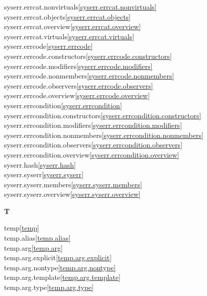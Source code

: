 \begin{multicols}{2}
syserr.errcat.nonvirtuals\quad\ref{syserr.errcat.nonvirtuals}\\
syserr.errcat.objects\quad\ref{syserr.errcat.objects}\\
syserr.errcat.overview\quad\ref{syserr.errcat.overview}\\
syserr.errcat.virtuals\quad\ref{syserr.errcat.virtuals}\\
syserr.errcode\quad\ref{syserr.errcode}\\
syserr.errcode.constructors\quad\ref{syserr.errcode.constructors}\\
syserr.errcode.modifiers\quad\ref{syserr.errcode.modifiers}\\
syserr.errcode.nonmembers\quad\ref{syserr.errcode.nonmembers}\\
syserr.errcode.observers\quad\ref{syserr.errcode.observers}\\
syserr.errcode.overview\quad\ref{syserr.errcode.overview}\\
syserr.errcondition\quad\ref{syserr.errcondition}\\
syserr.errcondition.constructors\quad\ref{syserr.errcondition.constructors}\\
syserr.errcondition.modifiers\quad\ref{syserr.errcondition.modifiers}\\
syserr.errcondition.nonmembers\quad\ref{syserr.errcondition.nonmembers}\\
syserr.errcondition.observers\quad\ref{syserr.errcondition.observers}\\
syserr.errcondition.overview\quad\ref{syserr.errcondition.overview}\\
syserr.hash\quad\ref{syserr.hash}\\
syserr.syserr\quad\ref{syserr.syserr}\\
syserr.syserr.members\quad\ref{syserr.syserr.members}\\
syserr.syserr.overview\quad\ref{syserr.syserr.overview}\\
\par \textbf{T}\par
temp\quad\ref{temp}\\
temp.alias\quad\ref{temp.alias}\\
temp.arg\quad\ref{temp.arg}\\
temp.arg.explicit\quad\ref{temp.arg.explicit}\\
temp.arg.nontype\quad\ref{temp.arg.nontype}\\
temp.arg.template\quad\ref{temp.arg.template}\\
temp.arg.type\quad\ref{temp.arg.type}\\

\end{multicols}
